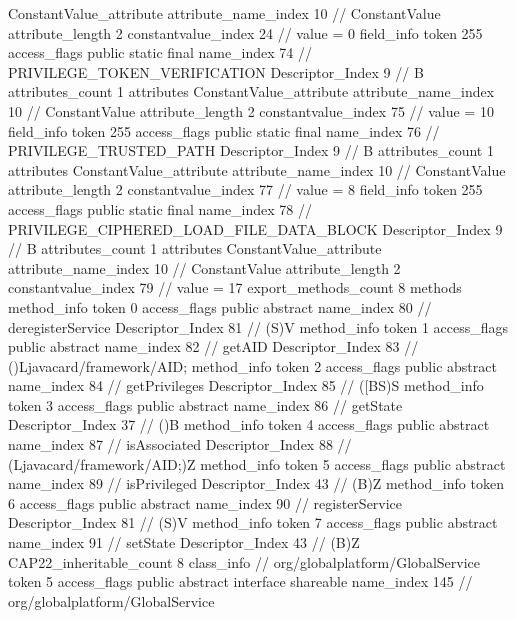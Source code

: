 {{{{{{				ConstantValue_attribute {
					attribute_name_index	10		// ConstantValue
					attribute_length	2
					constantvalue_index	24		// value = 0
				}
				}
			}
			field_info {
				token	255
				access_flags	public static final
				name_index	74		// PRIVILEGE_TOKEN_VERIFICATION
				Descriptor_Index	9		// B
				attributes_count	1
				attributes {
				ConstantValue_attribute {
					attribute_name_index	10		// ConstantValue
					attribute_length	2
					constantvalue_index	75		// value = 10
				}
				}
			}
			field_info {
				token	255
				access_flags	public static final
				name_index	76		// PRIVILEGE_TRUSTED_PATH
				Descriptor_Index	9		// B
				attributes_count	1
				attributes {
				ConstantValue_attribute {
					attribute_name_index	10		// ConstantValue
					attribute_length	2
					constantvalue_index	77		// value = 8
				}
				}
			}
			field_info {
				token	255
				access_flags	public static final
				name_index	78		// PRIVILEGE_CIPHERED_LOAD_FILE_DATA_BLOCK
				Descriptor_Index	9		// B
				attributes_count	1
				attributes {
				ConstantValue_attribute {
					attribute_name_index	10		// ConstantValue
					attribute_length	2
					constantvalue_index	79		// value = 17
				}
				}
			}
			}
			export_methods_count	8
			methods {
				method_info {
					token	0
					access_flags	public abstract
					name_index	80		// deregisterService
					Descriptor_Index	81		// (S)V
				}
				method_info {
					token	1
					access_flags	public abstract
					name_index	82		// getAID
					Descriptor_Index	83		// ()Ljavacard/framework/AID;
				}
				method_info {
					token	2
					access_flags	public abstract
					name_index	84		// getPrivileges
					Descriptor_Index	85		// ([BS)S
				}
				method_info {
					token	3
					access_flags	public abstract
					name_index	86		// getState
					Descriptor_Index	37		// ()B
				}
				method_info {
					token	4
					access_flags	public abstract
					name_index	87		// isAssociated
					Descriptor_Index	88		// (Ljavacard/framework/AID;)Z
				}
				method_info {
					token	5
					access_flags	public abstract
					name_index	89		// isPrivileged
					Descriptor_Index	43		// (B)Z
				}
				method_info {
					token	6
					access_flags	public abstract
					name_index	90		// registerService
					Descriptor_Index	81		// (S)V
				}
				method_info {
					token	7
					access_flags	public abstract
					name_index	91		// setState
					Descriptor_Index	43		// (B)Z
				}
			}
			CAP22_inheritable_count	8
		}
		class_info {		// org/globalplatform/GlobalService
			token	5
			access_flags	public abstract interface shareable
			name_index	145		// org/globalplatform/GlobalService
}}}
